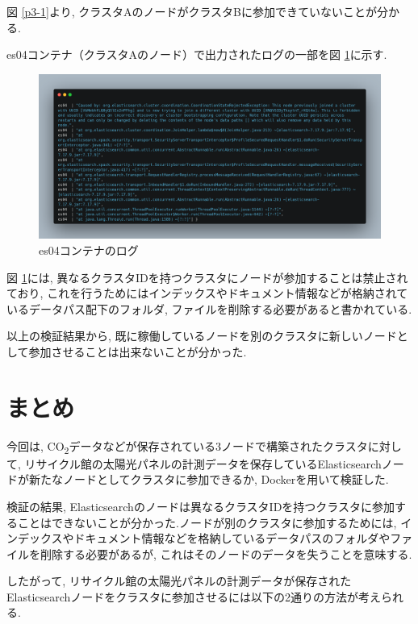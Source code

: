 \documentclass[a4j,12pt,]{jarticle}
\begin{document}
図 \ref{p3-1}より, クラスタAのノードがクラスタBに参加できていないことが分かる.

es04コンテナ（クラスタAのノード）で出力されたログの一部を図 \ref{p3-2}に示す.

\begin{figure}[H]
  \begin{center}
    \includegraphics[width=160mm]{es04-log.png}
    \caption{es04コンテナのログ}
    \label{p3-2}
  \end{center}
\end{figure}

図 \ref{p3-2}には, 異なるクラスタIDを持つクラスタにノードが参加することは禁止されており, これを行うためにはインデックスやドキュメント情報などが格納されているデータパス配下のフォルダ, ファイルを削除する必要があると書かれている.

以上の検証結果から, 既に稼働しているノードを別のクラスタに新しいノードとして参加させることは出来ないことが分かった.

\section{まとめ}
今回は, CO\textsubscript{2}データなどが保存されている3ノードで構築されたクラスタに対して, リサイクル館の太陽光パネルの計測データを保存しているElasticsearchノードが新たなノードとしてクラスタに参加できるか, Dockerを用いて検証した.

検証の結果, Elasticsearchのノードは異なるクラスタIDを持つクラスタに参加することはできないことが分かった.ノードが別のクラスタに参加するためには, インデックスやドキュメント情報などを格納しているデータパスのフォルダやファイルを削除する必要があるが, これはそのノードのデータを失うことを意味する.

したがって, リサイクル館の太陽光パネルの計測データが保存されたElasticsearchノードをクラスタに参加させるには以下の2通りの方法が考えられる.
\end{document}

